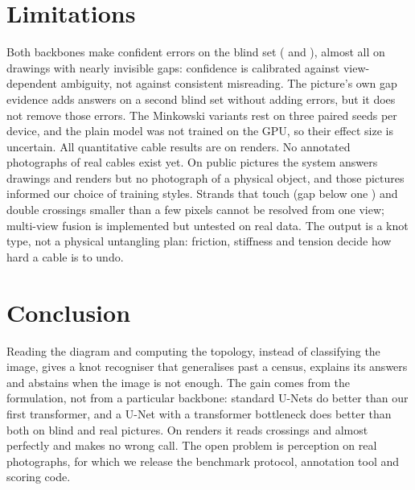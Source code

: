 \section{Limitations}\label{sec:limits}
Both backbones make confident errors on the blind set (\BlindWrong{} and \UPBlindWrong{}), almost
all on drawings with nearly invisible gaps: confidence is calibrated against view-dependent
ambiguity, not against consistent misreading. The picture's own gap evidence adds answers on a
second blind set without adding errors, but it does not remove those errors. The Minkowski
variants rest on three paired seeds per device, and the plain model was not trained on the GPU,
so their effect size is uncertain. All quantitative cable results are on renders. No annotated photographs of real cables
exist yet. On public pictures the system answers drawings and renders but no photograph
of a physical object, and those pictures informed our choice of training styles. Strands
that touch (gap below one \cw) and double crossings smaller than a few pixels
cannot be resolved from one view; multi-view fusion is implemented but untested on real
data. The output is a knot type, not a physical untangling plan: friction, stiffness
and tension decide how hard a cable is to undo.

\section{Conclusion}\label{sec:concl}
Reading the diagram and computing the topology, instead of classifying the image,
gives a knot recogniser that generalises past a census, explains its answers and
abstains when the image is not enough. The gain comes from the formulation, not from a
particular backbone: standard U-Nets do better than our first transformer, and a U-Net with a
transformer bottleneck does better than both on blind and real pictures. On renders it reads crossings and \ou{} almost
perfectly and makes no wrong call. The open problem is perception on real photographs,
for which we release the benchmark protocol, annotation tool and scoring code.
